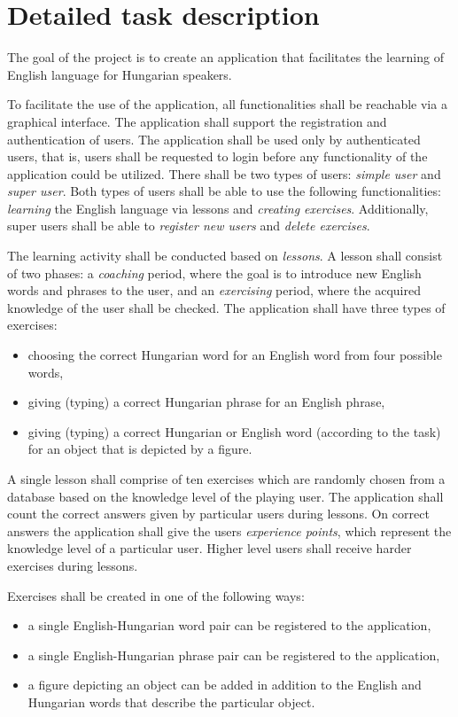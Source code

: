 \documentclass[a4paper]{article}
\begin{document}
	\section{Detailed task description}
	The goal of the project is to create an application that facilitates the learning of English language for Hungarian speakers.
	
	To facilitate the use of the application, all functionalities shall be reachable via a graphical interface. The application shall support the registration and authentication of users. The application shall be used only by authenticated users, that is,  users shall be requested to login before any functionality of the application could be utilized. There shall be two types of users: \textsl{simple user} and \textsl{super user}. Both types of users shall be able to use the following functionalities: \emph{learning} the English language via lessons and \emph{creating exercises}. Additionally, super users shall be able to \emph{register new users} and \emph{delete exercises}.
	
	The learning activity shall be conducted based on \emph{lessons}. A lesson shall consist of two phases: a \emph{coaching} period, where the goal is to introduce new English words and phrases to the user, and an \emph{exercising} period, where the acquired knowledge of the user shall be checked. The application shall have three types of exercises:
	\begin{itemize}
		\item choosing the correct Hungarian word for an English word from four possible words,
		\item giving (typing) a correct Hungarian phrase for an English phrase,
		\item giving (typing) a correct Hungarian or English word (according to the task) for an object that is depicted by a figure.
	\end{itemize}
	A single lesson shall comprise of ten exercises which are randomly chosen from a database based on the knowledge level of the playing user. The application shall count the correct answers given by particular users during lessons. On correct answers the application shall give the users \emph{experience points}, which represent the knowledge level of a particular user. Higher level users shall receive harder exercises during lessons. 

	Exercises shall be created in one of the following ways:
	\begin{itemize}
		\item a single English-Hungarian word pair can be registered to the application,
		\item a single English-Hungarian phrase pair can be registered to the application,
		\item a figure depicting an object can be added in addition to the English and Hungarian words that describe the particular object.
	\end{itemize}
	
\end{document}
